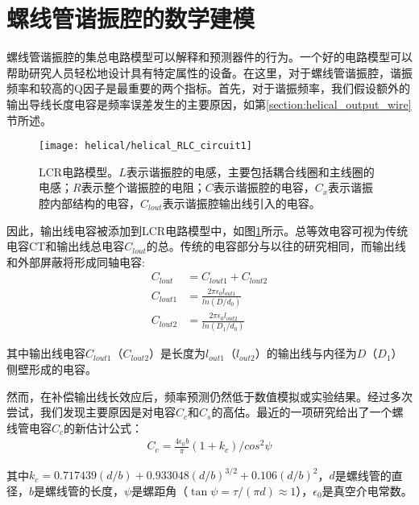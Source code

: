 
\newpage
\section[螺线管谐振腔的数学建模]{螺线管谐振腔的数学建模\label{section:helical_theory_model}}

螺线管谐振腔的集总电路模型可以解释和预测器件的行为。一个好的电路模型可以帮助研究人员轻松地设计具有特定属性的设备。在这里，对于螺线管谐振腔，谐振频率和较高的Q因子是最重要的两个指标。首先，对于谐振频率，我们假设额外的输出导线长度电容是频率误差发生的主要原因，如第\ref{section:helical_output_wire}节所述。

\begin{figure}
    \centering
    \caption[LCR电路模型]{LCR电路模型。$L$表示谐振腔的电感，主要包括耦合线圈和主线圈的电感；$R$表示整个谐振腔的电阻；$C$表示谐振腔的电容，$C_x$表示谐振腔内部结构的电容，$C_{lout}$表示谐振腔输出线引入的电容。\label{fig:helical_RLC_circuit1}}
    \texttt{[image: helical/helical\_RLC\_circuit1]}
\end{figure}

因此，输出线电容被添加到LCR电路模型中，如图\ref{fig:helical_RLC_circuit1}所示。总等效电容可视为传统电容CT和输出线总电容$C_{lout}$的总。传统的电容部分与以往的研究相同，而输出线和外部屏蔽将形成同轴电容:
\begin{align} 
	C_{lout}&=C_{lout1}+C_{lout2} \label{eq:helical_lout}\\ 
	C_{lout1}&=\frac{2\pi\epsilon_0 l_{out1}}{ln(D/d_0)} \label{eq:helical_lout1}\\ 
	C_{lout2}&=\frac{2\pi\epsilon_0 l_{out2}}{ln(D_1/d_0)} \label{eq:helical_lout2}
\end{align}

其中输出线电容$C_{lout1}$（$C_{lout2}$）是长度为$l_{out1}$（$l_{out2}$）的输出线与内径为$D$（$D_1$）侧壁形成的电容。

然而，在补偿输出线长效应后，频率预测仍然低于数值模拟或实验结果。经过多次尝试，我们发现主要原因是对电容$C_c$和$C_s$的高估。最近的一项研究\cite[p52,f5.3]{article_2010}给出了一个螺线管电容$C_c$的新估计公式：
\begin{align}
    C_c=\frac{4\epsilon_0 b}{\pi}(1+k_c)/cos^2\psi 	\label{eq:helical_C_c_new}
\end{align}

其中$k_c=0.717439(d/b)+0.933048(d/b)^{3/2}+0.106(d/b)^2$，$d$是螺线管的直径，$b$是螺线管的长度，$\psi$是螺距角（$\tan\psi=\tau/(\pi d)\approx 1$），$\epsilon_0$是真空介电常数。

